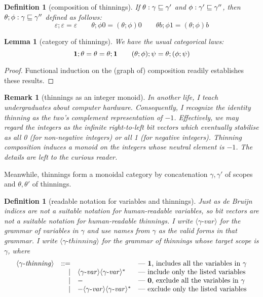 \documentclass{jfp1}
\newtheorem{lemma}[theorem]{Lemma}
\newtheorem{definition}[theorem]{Definition}
\newtheorem{remark}[theorem]{Remark}
\newcommand{\emp}{\varepsilon}
\newcommand{\GS}[2]{\langle#1\textrm{-}\mathit{#2}\rangle}
\begin{document}
\begin{definition}[composition of thinnings]
  If $\theta:\gamma\sqsubseteq \gamma'$ and $\phi:\gamma'\sqsubseteq\gamma''$, then $\theta;\phi : \gamma\sqsubseteq\gamma''$
  defined as follows:
  \[
    \emp;\emp = \emp \qquad
    \theta;\phi0 = (\theta;\phi)0 \qquad
    \theta b;\phi1 = (\theta;\phi)b
  \]
\end{definition}

\begin{lemma}[category of thinnings]
  We have the usual categorical laws:
  \[
    \mathbf{1};\theta = \theta = \theta;\mathbf{1} \qquad
    (\theta;\phi);\psi = \theta;(\phi;\psi)
    \]
\end{lemma}
\begin{proof}
  Functional induction on the (graph of) composition readily establishes these results.
\end{proof}

\begin{remark}[thinnings as an integer monoid]
  In another life, I teach undergraduates about computer hardware. Consequently, I recognize the identity thinning as the two's complement representation of $-1$.
  Effectively, we may regard the integers as the infinite right-to-left bit vectors which eventually stabilise as all 0 (for non-negative integers) or all 1 (for negative integers). Thinning composition induces a monoid on the integers whose neutral element is $-1$. The details are left to the curious reader.
\end{remark}

Meanwhile, thinnings form a monoidal category by concatenation $\gamma,\gamma'$ of scopes and $\theta,\theta'$ of thinnings.

\begin{definition}[readable notation for variables and thinnings]
Just as de Bruijn indices are not a suitable notation for human-readable variables, so bit vectors are not a suitable notation for human-readable thinnings.
I write $\GS\gamma{var}$ for the grammar of variables in $\gamma$ and use names from $\gamma$ as the valid forms in that grammar. I write $\GS\gamma{thinning}$
for the grammar of thinnings whose target scope is $\gamma$, where
  \[\begin{array}{rrll}
      \GS\gamma{thinning} & ::= & & \mbox{--- $\ith$, includes all the variables in $\gamma$}\\
                    &   | & \GS\gamma{var} \GS\gamma{var}^\ast  & \mbox{--- include only the listed variables}\\
                    &   | & - & \mbox{--- $\eth$, exclude all the variables in $\gamma$}\\
                    &   | & - \GS\gamma{var} \GS\gamma{var}^\ast & \mbox{--- exclude only the listed variables} \\
    \end{array}\]
\end{definition}
\end{document}
